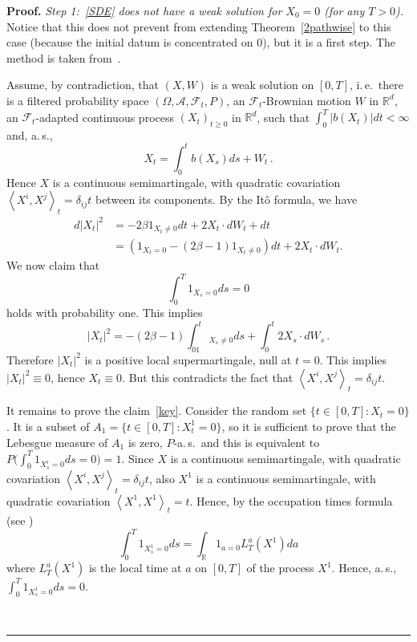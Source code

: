 \documentclass[a4paper,10pt]{article}
\newenvironment{proof}[1][Proof]{\noindent\textbf{#1.} }{\ \rule{0.5em}{0.5em}}
\begin{document}
\begin{proof}
\emph{Step 1:~\eqref{SDE} does not have a weak solution for $X_0=0$ (for any $T>0$).} Notice that this does not prevent from extending Theorem~\ref{2pathwise} to this case (because the initial datum is concentrated on $0$), but it is a first step. The method is taken from~\cite{Cerny Engelbert}.

Assume, by contradiction, that $(X,W)$ is a weak solution on
$[0,T]$, i.\,e.\ there is a filtered probability
space $(\Omega,\mathcal{A},\mathcal{F}_{t},P)$, an
$\mathcal{F}_{t}$-Brownian motion $W$ in $\mathbb{R}^{d}$, an $\mathcal{F} 
_{t}$-adapted continuous process $(X_{t})_{t\geq0}$ in
$\mathbb{R}^{d}$, such that $ \int_{0}^{T} \vert b(X_{t}) \vert dt<\infty$ and, a.\,s.,
\[
X_{t}=\int_{0}^{t}b(X_{s}) ds+W_{t} \,.
\]
Hence $X$ is a continuous semimartingale, with quadratic covariation
$\left\langle X^{i},X^{j}\right\rangle _{t}=\delta_{ij}t$ between its
components. By the It\^{o} formula, we have
\begin{align*}
d\left\vert X_{t}\right\vert ^{2}  & =-2\beta1_{X_{t}\neq0}dt+2X_{t}\cdot
dW_{t}+dt\\
& =(1_{X_{t}=0}-(2\beta-1)1_{X_{t}\neq0})dt+2X_{t}\cdot dW_{t}.
\end{align*}
We now claim that
\begin{equation}
\int_{0}^{T}1_{X_{s}=0}ds=0\label{key} 
\end{equation}
holds with probability one. This implies
\[
\vert X_{t} \vert ^{2}=-(2\beta-1)\int^t_01_{X_{s}\neq0}ds+\int_{0}^{t}2X_{s}\cdot dW_{s}\,.
\]
Therefore $\vert X_{t} \vert^{2}$ is a positive local supermartingale,
null at $t=0$. This implies $\vert X_{t} \vert^{2}\equiv0$, hence $X_{t}\equiv0$. But this contradicts the fact
that $\left\langle X^{i},X^{j}\right\rangle _{t}=\delta_{ij}t$. 

It remains to prove the claim~\eqref{key}. Consider the random set $\{ t\in [
0,T] \colon X_{t}=0\}$. It is a subset of $A_{1}=\{ t\in [0,T] \colon X_{t}^{1}=0 \}$, so it is sufficient to prove that the Lebesgue measure of $A_{1}$ is zero, $P$-a.\,s.\ and this is equivalent to $P\big(\int_{0}^{T} 1_{X_{s}^{i}=0}ds=0 \big)=1$. Since $X$ is a
continuous semimartingale, with quadratic covariation $\left\langle
X^{i},X^{j}\right\rangle _{t}=\delta_{ij}t$, also $X^{1}$ is a continuous
semimartingale, with quadratic covariation $\left\langle X^{1},X^{1} 
\right\rangle _{t}=t$. Hence, by the occupation times formula (see
\cite[Chapter~VI, Corollary~1.6]{RevuzYor})
\[
\int_{0}^{T}1_{X_{s}^{1}=0}ds=\int_{\mathbb{R}}1_{a=0}L_{T}^{a}(X^{1})  da
\]
where $L_{T}^{a}( X^{1})$ is the local time at $a$ on $[
0,T]  $ of the process $X^{1}$. Hence, a.\,s.,  $\int_{0}^{T}1_{X_{s}^{1}=0}ds=0$. 


\end{proof}
\end{document}
